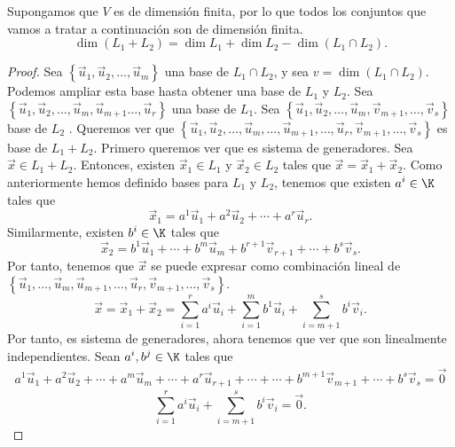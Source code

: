 \begin{ftheorem}
\normalfont Supongamos que $\displaystyle V $ es de dimensión finita, por lo que todos los conjuntos que vamos a tratar a continuación son de dimensión finita.
\[\dim \left(L_{1} + L_{2}\right) = \dim L_{1} + \dim L_{2} - \dim \left(L_{1} \cap L_{2}\right) .\]
\end{ftheorem}

\begin{proof}
	Sea $\displaystyle \left\{ \vec{u}_{1}, \vec{u}_{2}, \ldots, \vec{u}_{m}\right\}  $ una base de $\displaystyle L_{1} \cap L_{2} $, y sea $\displaystyle v = \dim \left(L_{1} \cap L_{2}\right) $. Podemos ampliar esta base hasta obtener una base de $\displaystyle L_{1} $ y $\displaystyle L_{2} $. Sea $\displaystyle \left\{ \vec{u}_{1}, \vec{u}_{2}, \ldots, \vec{u}_{m}, \vec{u}_{m+1} \ldots, \vec{u}_{r}\right\} $ una base de $\displaystyle L_{1} $. Sea $\displaystyle \left\{ \vec{u}_{1}, \vec{u}_{2}, \ldots, \vec{u}_{m}, \vec{v}_{m+1}, \ldots, \vec{v}_{s}\right\} $ base de $\displaystyle L_{2} $ . Queremos ver que $\displaystyle \left\{ \vec{u}_{1}, \vec{u}_{2}, \ldots, \vec{u}_{m}, \ldots, \vec{u}_{m+1}, \ldots,\vec{u}_{r}, \vec{v}_{m+1}, \ldots, \vec{v}_{s}\right\} $  es base de $\displaystyle L_{1}+L_{2} $. Primero queremos ver que es sistema de generadores. Sea $\displaystyle \vec{x} \in L_{1}+L_{2} $. Entonces, existen $\displaystyle \vec{x}_{1}\in L_{1} $ y $\displaystyle \vec{x}_{2}\in L_{2} $ tales que $\displaystyle \vec{x} = \vec{x}_{1} + \vec{x}_{2} $. Como anteriormente hemos definido bases para $\displaystyle L_{1} $ y $\displaystyle L_{2} $, tenemos que existen $\displaystyle a^{i}\in\K $ tales que 
	\[\vec{x}_{1} = a^{1}\vec{u}_{1} + a^{2}\vec{u}_{2} + \cdots + a^{r}\vec{u}_{r} .\]
Similarmente, existen $\displaystyle b^{i}\in \K $ tales que
\[\vec{x}_{2} = b^{1}\vec{u}_{1} + \cdots + b^{m}\vec{u}_{m}+b^{r+1}\vec{v}_{r+1} + \cdots + b^{s}\vec{v}_{s} .\]
Por tanto, tenemos que $\displaystyle \vec{x} $ se puede expresar como combinación lineal de $\displaystyle \left\{ \vec{u}_{1}, \ldots, \vec{u}_{m}, \vec{u}_{m+1}, \ldots, \vec{u}_{r}, \vec{v}_{m+1}, \ldots, \vec{v}_{s}\right\}  $. 
\[\vec{x} = \vec{x}_{1} + \vec{x}_{2} = \sum^{r}_{i=1}a^{i}\vec{u}_{i} + \sum^{m}_{i=1}b^{1}\vec{u}_{i} + \sum^{s}_{i = m+1}b^{i}\vec{v}_{i} .\]
Por tanto, es sistema de generadores, ahora tenemos que ver que son linealmente independientes. Sean $\displaystyle a^{i}, b^{j} \in \K $ tales que 
\[
\begin{split}
  a^{1}\vec{u}_{1} + a^{2}\vec{u}_{2} + \cdots +a^{m}\vec{u}_{m} + \cdots + a^{r}\vec{u}_{r+1} + \cdots + \cdots + b^{m+1}\vec{v}_{m+1} + \cdots + b^{s}\vec{v}_{s} = \vec{0}  
\end{split}
\]
\[ \sum^{r}_{i=1}a^{i}\vec{u}_{i} + \sum^{s}_{i = m+1}b^{i}\vec{v}_{i} = \vec{0}. \]


\end{proof}
